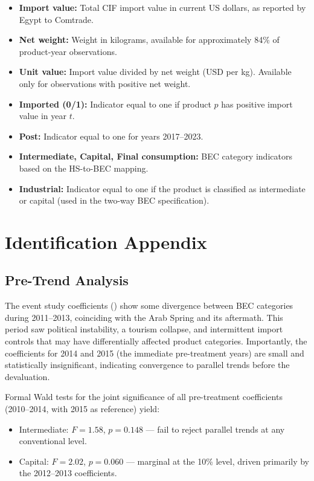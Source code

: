 \documentclass[12pt]{article}
\begin{document}
\begin{itemize}
\item \textbf{Import value:} Total CIF import value in current US dollars, as reported by Egypt to Comtrade.
\item \textbf{Net weight:} Weight in kilograms, available for approximately 84\% of product-year observations.
\item \textbf{Unit value:} Import value divided by net weight (USD per kg). Available only for observations with positive net weight.
\item \textbf{Imported (0/1):} Indicator equal to one if product $p$ has positive import value in year $t$.
\item \textbf{Post:} Indicator equal to one for years 2017--2023.
\item \textbf{Intermediate, Capital, Final consumption:} BEC category indicators based on the HS-to-BEC mapping.
\item \textbf{Industrial:} Indicator equal to one if the product is classified as intermediate or capital (used in the two-way BEC specification).
\end{itemize}


\section{Identification Appendix}
\label{sec:ident_appendix}

\subsection{Pre-Trend Analysis}

The event study coefficients () show some divergence between BEC categories during 2011--2013, coinciding with the Arab Spring and its aftermath. This period saw political instability, a tourism collapse, and intermittent import controls that may have differentially affected product categories. Importantly, the coefficients for 2014 and 2015 (the immediate pre-treatment years) are small and statistically insignificant, indicating convergence to parallel trends before the devaluation.

Formal Wald tests for the joint significance of all pre-treatment coefficients (2010--2014, with 2015 as reference) yield:
\begin{itemize}
\item Intermediate: $F = 1.58$, $p = 0.148$ --- fail to reject parallel trends at any conventional level.
\item Capital: $F = 2.02$, $p = 0.060$ --- marginal at the 10\% level, driven primarily by the 2012--2013 coefficients.
\end{itemize}
\end{document}
